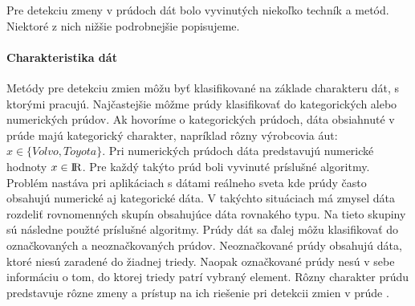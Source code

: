 \label{fig:zmeny-vseobecny-dia}

Pre detekciu zmeny v prúdoch dát bolo vyvinutých niekoľko techník a metód. Niektoré z nich nižšie podrobnejšie popisujeme.

\paragraph{Charakteristika dát} Metódy pre detekciu zmien môžu byť klasifikované na základe charakteru dát, s ktorými pracujú. Najčastejšie môžme prúdy klasifikovať do kategorických alebo numerických prúdov. Ak hovoríme o kategorických prúdoch, dáta obsiahnuté v prúde majú kategorický charakter, napríklad rôzny výrobcovia áut: $x \in \{Volvo, Toyota\}$. Pri numerických prúdoch dáta predstavujú numerické hodnoty $x \in {\rm I\!R}$. Pre každý takýto prúd boli vyvinuté príslušné algoritmy. Problém nastáva pri aplikáciach s dátami reálneho sveta kde prúdy často obsahujú numerické aj kategorické dáta. V takýchto situáciach má zmysel dáta rozdeliť rovnomenných skupín obsahujúce dáta rovnakého typu. Na tieto skupiny sú následne použté príslušné algoritmy. Prúdy dát sa ďalej môžu klasifikovať do označkovaných a neoznačkovaných prúdov. Neoznačkované prúdy obsahujú dáta, ktoré niesú zaradené do žiadnej triedy. Naopak označkované prúdy nesú v sebe informáciu o tom, do ktorej triedy patrí vybraný element. Rôzny charakter prúdu predstavuje rôzne zmeny a prístup na ich riešenie pri detekcii zmien v prúde \citep{tran2014change}.

